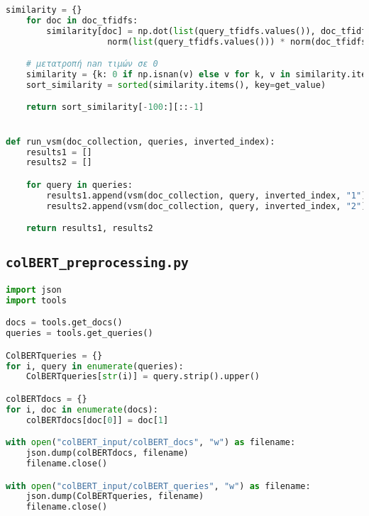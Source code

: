 \begin{lstlisting}[language=Python]
    similarity = {}
    for doc in doc_tfidfs:
        similarity[doc] = np.dot(list(query_tfidfs.values()), doc_tfidfs[doc]) / (
                    norm(list(query_tfidfs.values())) * norm(doc_tfidfs[doc]))

    # μετατροπή nan τιμών σε 0
    similarity = {k: 0 if np.isnan(v) else v for k, v in similarity.items()}
    sort_similarity = sorted(similarity.items(), key=get_value)

    return sort_similarity[-100:][::-1]


def run_vsm(doc_collection, queries, inverted_index):
    results1 = []
    results2 = []

    for query in queries:
        results1.append(vsm(doc_collection, query, inverted_index, "1"))
        results2.append(vsm(doc_collection, query, inverted_index, "2"))

    return results1, results2
\end{lstlisting}


\subsection{\texttt{colBERT\_preprocessing.py}}
\begin{lstlisting}[language=Python]
import json
import tools

docs = tools.get_docs()
queries = tools.get_queries()

ColBERTqueries = {}
for i, query in enumerate(queries):
    ColBERTqueries[str(i)] = query.strip().upper()

colBERTdocs = {}
for i, doc in enumerate(docs):
    colBERTdocs[doc[0]] = doc[1]

with open("colBERT_input/colBERT_docs", "w") as filename:
    json.dump(colBERTdocs, filename)
    filename.close()

with open("colBERT_input/colBERT_queries", "w") as filename:
    json.dump(ColBERTqueries, filename)
    filename.close()
\end{lstlisting}


